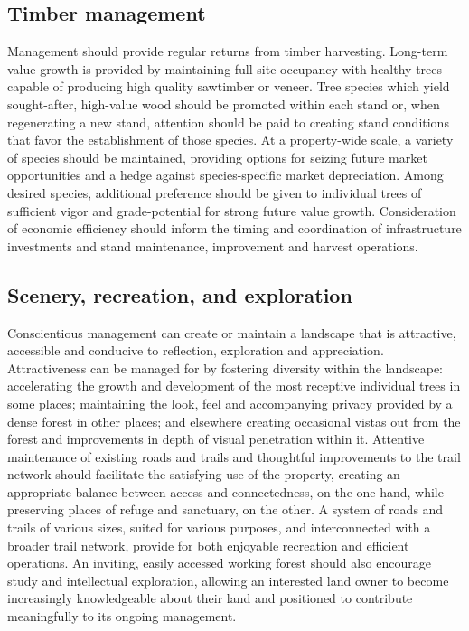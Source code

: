 \documentclass[]{tufte-handout}
\begin{document}
\subsection{Timber management}\label{timber-management}

Management should provide regular returns from timber harvesting.
Long-term value growth is provided by maintaining full site occupancy
with healthy trees capable of producing high quality sawtimber or
veneer. Tree species which yield sought-after, high-value wood should be
promoted within each stand or, when regenerating a new stand, attention
should be paid to creating stand conditions that favor the establishment
of those species. At a property-wide scale, a variety of species should
be maintained, providing options for seizing future market opportunities
and a hedge against species-specific market depreciation. Among desired
species, additional preference should be given to individual trees of
sufficient vigor and grade-potential for strong future value growth.
Consideration of economic efficiency should inform the timing and
coordination of infrastructure investments and stand maintenance,
improvement and harvest operations.

\subsection{Scenery, recreation, and
exploration}\label{scenery-recreation-and-exploration}

Conscientious management can create or maintain a landscape that is
attractive, accessible and conducive to reflection, exploration and
appreciation. Attractiveness can be managed for by fostering diversity
within the landscape: accelerating the growth and development of the
most receptive individual trees in some places; maintaining the look,
feel and accompanying privacy provided by a dense forest in other
places; and elsewhere creating occasional vistas out from the forest and
improvements in depth of visual penetration within it. Attentive
maintenance of existing roads and trails and thoughtful improvements to
the trail network should facilitate the satisfying use of the property,
creating an appropriate balance between access and connectedness, on the
one hand, while preserving places of refuge and sanctuary, on the other.
A system of roads and trails of various sizes, suited for various
purposes, and interconnected with a broader trail network, provide for
both enjoyable recreation and efficient operations. An inviting, easily
accessed working forest should also encourage study and intellectual
exploration, allowing an interested land owner to become increasingly
knowledgeable about their land and positioned to contribute meaningfully
to its ongoing management.
\end{document}
